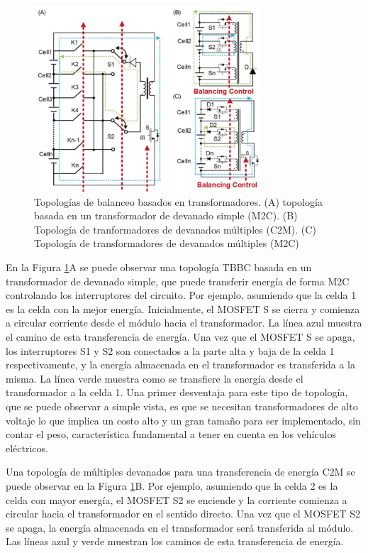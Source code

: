 \documentclass[10pt,a4paper]{article}
\begin{document}
\begin{figure}[h!]
    \begin{center}
        \includegraphics[width=0.75\textwidth]{tbbc_top.png}
        \caption{Topolog\'ias de balanceo basados en transformadores. (A)
        topolog\'ia basada en un transformador de devanado simple
        (\acrshort{M2C}). (B) Topolog\'ia de tranformadores de devanados
        m\'ultiples (\acrshort{C2M}). (C) Topolog\'ia de transformadores de
        devanados m\'ultiples (\acrshort{M2C})}
        \label{tbbc_top}
    \end{center}
\end{figure}

En la Figura \ref{tbbc_top}A se puede observar una topolog\'ia \acrshort{TBBC}
basada en un transformador de devanado simple, que puede transferir energ\'ia de
forma \acrshort{M2C} controlando los interruptores del circuito. Por ejemplo,
asumiendo que la celda 1 es la celda con la mejor energ\'ia. Inicialmente, el
MOSFET S se cierra y comienza a circular corriente desde el m\'odulo hacia el
transformador. La línea azul muestra el camino de esta transferencia de
energ\'ia. Una vez que el MOSFET S se apaga, los interruptores S1 y S2 son
conectados a la parte alta y baja de la celda 1 respectivamente, y la energ\'ia
almacenada en el transformador es transferida a la misma. La línea verde muestra
como se transfiere la energ\'ia desde el transformador a la celda 1. Una primer
desventaja para este tipo de topolog\'ia, que se puede observar a simple vista,
es que se necesitan transformadores de alto voltaje lo que implica un costo alto
y un gran tamaño para ser implementado, sin contar el peso, característica
fundamental a tener en cuenta en los vehículos eléctricos.

Una topolog\'ia de m\'ultiples devanados para una transferencia de energ\'ia
\acrshort{C2M} se puede observar en la Figura \ref{tbbc_top}B. Por ejemplo,
asumiendo que la celda 2 es la celda con mayor energ\'ia, el MOSFET S2 se
enciende y la corriente comienza a circular hacia el transformador en el sentido
directo. Una vez que el MOSFET S2 se apaga, la energ\'ia almacenada en el
transformador ser\'a transferida al m\'odulo. Las líneas azul y verde muestran
los caminos de esta transferencia de energ\'ia.
\end{document}
